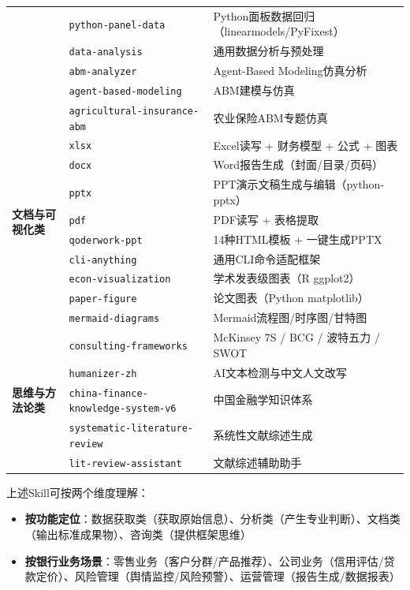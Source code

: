 \begin{table}[H]
\begin{tabular}{lp{2.8cm}p{8cm}}
& \texttt{python-panel-data} & Python面板数据回归（linearmodels/PyFixest） \\
& \texttt{data-analysis} & 通用数据分析与预处理 \\
& \texttt{abm-analyzer} & Agent-Based Modeling仿真分析 \\
& \texttt{agent-based-modeling} & ABM建模与仿真 \\
& \texttt{agricultural-insurance-abm} & 农业保险ABM专题仿真 \\
\midrule
\multirow{8}{*}{\textbf{文档与可视化类}} & \texttt{xlsx} & Excel读写 + 财务模型 + 公式 + 图表 \\
& \texttt{docx} & Word报告生成（封面/目录/页码） \\
& \texttt{pptx} & PPT演示文稿生成与编辑（python-pptx） \\
& \texttt{pdf} & PDF读写 + 表格提取 \\
& \texttt{qoderwork-ppt} & 14种HTML模板 + 一键生成PPTX \\
& \texttt{cli-anything} & 通用CLI命令适配框架 \\
& \texttt{econ-visualization} & 学术发表级图表（R ggplot2） \\
& \texttt{paper-figure} & 论文图表（Python matplotlib） \\
& \texttt{mermaid-diagrams} & Mermaid流程图/时序图/甘特图 \\
\midrule
\multirow{5}{*}{\textbf{思维与方法论类}} & \texttt{consulting-frameworks} & McKinsey 7S / BCG / 波特五力 / SWOT \\
& \texttt{humanizer-zh} & AI文本检测与中文人文改写 \\
& \texttt{china-finance-knowledge-system-v6} & 中国金融学知识体系 \\
& \texttt{systematic-literature-review} & 系统性文献综述生成 \\
& \texttt{lit-review-assistant} & 文献综述辅助助手 \\
\bottomrule
\end{tabular}
\end{table}

\begin{notebox}[Skill分类维度]
上述Skill可按两个维度理解：
\begin{itemize}[leftmargin=1em]
  \item \textbf{按功能定位}：数据获取类（获取原始信息）、分析类（产生专业判断）、文档类（输出标准成果物）、咨询类（提供框架思维）
  \item \textbf{按银行业务场景}：零售业务（客户分群/产品推荐）、公司业务（信用评估/贷款定价）、风险管理（舆情监控/风险预警）、运营管理（报告生成/数据报表）
\end{itemize}
\end{notebox}

